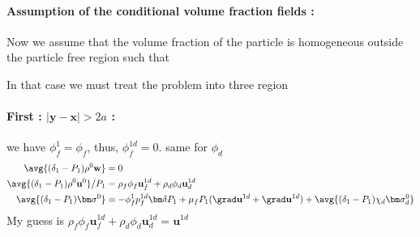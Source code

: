 \paragraph*{Assumption of the conditional volume fraction fields : }
Now we assume that the volume fraction of the particle is homogeneous outside the particle free region such that



In that case we must treat the problem into three region 
\paragraph*{First : $|\textbf{y} - \textbf{x}| > 2a$ :} we have $\phi_f^1 = \phi_f$, thus, $\phi_f^{1d} = 0$. same for $\phi_d$
\begin{align*}
    \avg{(\delta_1 - P_1)\rho^0\textbf{w}}
    &=0\\
    \avg{(\delta_1 - P_1)\rho^0\textbf{u}^0} / P_1
    &= 
    \rho_f\phi_f\textbf{u}^{1d}_f
    + 
    \rho_d\phi_d\textbf{u}^{1d}_d
    \\
    \avg{(\delta_1 - P_1)\bm\sigma^0} 
    &= 
    - \phi_f^1 p^{1d}_f\bm\delta P_1 
    +\mu_f P_1 (\grad \textbf{u}^{1d} + \grad \textbf{u}^{1d})
    + \avg{(\delta_1 - P_1) \chi_d\bm\sigma^0_d}
\end{align*}
My guess is $\rho_f\phi_f\textbf{u}^{1d}_f
+ 
\rho_d\phi_d\textbf{u}^{1d}_d = \textbf{u}^{1d}$ 

